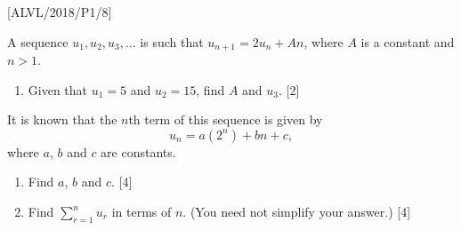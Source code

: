 \item {[}ALVL/2018/P1/8{]}

A sequence $u_{1},u_{2},u_{3},\dots$ is such that $u_{n+1}=2u_{n}+An$,
where $A$ is a constant and $n>1$. 
\begin{enumerate}
\item Given that $u_{1}=5$ and $u_{2}=15$, find $A$ and $u_{3}$. \hfill{}{[}2{]}
\end{enumerate}
It is known that the $n$th term of this sequence is given by 
\[
u_{n}=a\left(2^{n}\right)+bn+c,
\]
where $a$, $b$ and $c$ are constants. 
\begin{enumerate}
\item Find $a$, $b$ and $c$.\hfill{} {[}4{]}
\item Find $\sum_{r=1}^{n}u_{r}$ in terms of $n$. (You need not simplify
your answer.) \hfill{}{[}4{]}
\end{enumerate}
